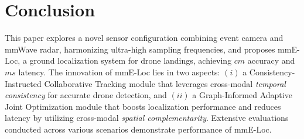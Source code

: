 \vspace{-0.2cm}
\section{Conclusion}\label{7}

This paper explores a novel sensor configuration combining event camera and mmWave radar, harmonizing ultra-high sampling frequencies, and proposes mmE-Loc, a ground localization system for drone landings, achieving $cm$  accuracy and $ms$ latency. 
The innovation of mmE-Loc lies in two aspects: 
$(i)$ a Consistency-Instructed Collaborative Tracking module that leverages cross-modal \textit{temporal consistency} for accurate drone detection, and $(ii)$ a Graph-Informed Adaptive Joint Optimization module that boosts localization performance and reduces latency by utilizing cross-modal \textit{spatial complementarity}. 
Extensive evaluations conducted across various scenarios demonstrate performance of mmE-Loc.


